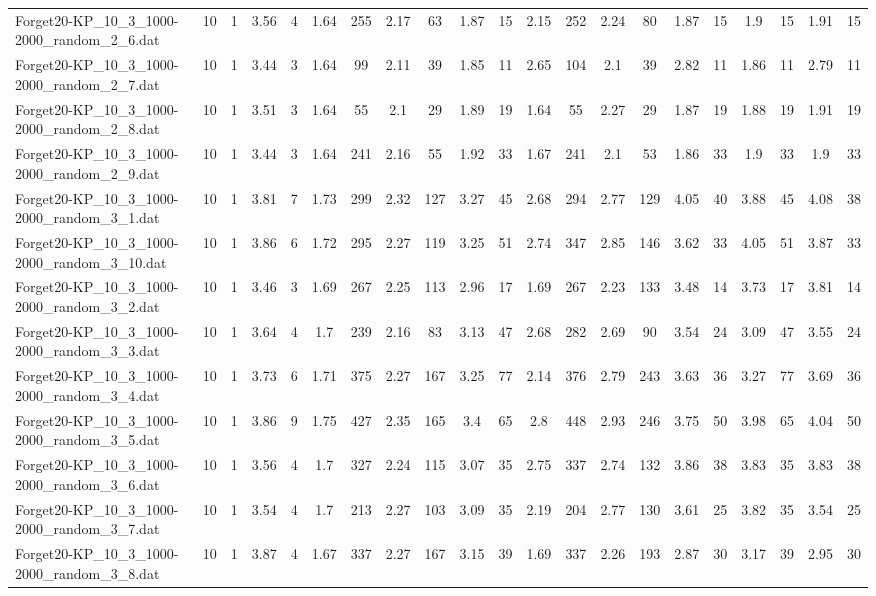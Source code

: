 \begin{sidewaystable}[!ht]
{\begin{tabular}{lcccccccccccccccccccc}
Forget20-KP\_10\_3\_1000-2000\_random\_2\_6.dat & 10 & 1 & 3.56 & 4 & 1.64 & 255 & 2.17 & 63 & 1.87 & 15 & 2.15 & 252 & 2.24 & 80 & 1.87 & 15 & 1.9 & 15 & 1.91 & 15 \\
Forget20-KP\_10\_3\_1000-2000\_random\_2\_7.dat & 10 & 1 & 3.44 & 3 & 1.64 & 99 & 2.11 & 39 & 1.85 & 11 & 2.65 & 104 & 2.1 & 39 & 2.82 & 11 & 1.86 & 11 & 2.79 & 11 \\
Forget20-KP\_10\_3\_1000-2000\_random\_2\_8.dat & 10 & 1 & 3.51 & 3 & 1.64 & 55 & 2.1 & 29 & 1.89 & 19 & 1.64 & 55 & 2.27 & 29 & 1.87 & 19 & 1.88 & 19 & 1.91 & 19 \\
Forget20-KP\_10\_3\_1000-2000\_random\_2\_9.dat & 10 & 1 & 3.44 & 3 & 1.64 & 241 & 2.16 & 55 & 1.92 & 33 & 1.67 & 241 & 2.1 & 53 & 1.86 & 33 & 1.9 & 33 & 1.9 & 33 \\
Forget20-KP\_10\_3\_1000-2000\_random\_3\_1.dat & 10 & 1 & 3.81 & 7 & 1.73 & 299 & 2.32 & 127 & 3.27 & 45 & 2.68 & 294 & 2.77 & 129 & 4.05 & 40 & 3.88 & 45 & 4.08 & 38 \\
Forget20-KP\_10\_3\_1000-2000\_random\_3\_10.dat & 10 & 1 & 3.86 & 6 & 1.72 & 295 & 2.27 & 119 & 3.25 & 51 & 2.74 & 347 & 2.85 & 146 & 3.62 & 33 & 4.05 & 51 & 3.87 & 33 \\
Forget20-KP\_10\_3\_1000-2000\_random\_3\_2.dat & 10 & 1 & 3.46 & 3 & 1.69 & 267 & 2.25 & 113 & 2.96 & 17 & 1.69 & 267 & 2.23 & 133 & 3.48 & 14 & 3.73 & 17 & 3.81 & 14 \\
Forget20-KP\_10\_3\_1000-2000\_random\_3\_3.dat & 10 & 1 & 3.64 & 4 & 1.7 & 239 & 2.16 & 83 & 3.13 & 47 & 2.68 & 282 & 2.69 & 90 & 3.54 & 24 & 3.09 & 47 & 3.55 & 24 \\
Forget20-KP\_10\_3\_1000-2000\_random\_3\_4.dat & 10 & 1 & 3.73 & 6 & 1.71 & 375 & 2.27 & 167 & 3.25 & 77 & 2.14 & 376 & 2.79 & 243 & 3.63 & 36 & 3.27 & 77 & 3.69 & 36 \\
Forget20-KP\_10\_3\_1000-2000\_random\_3\_5.dat & 10 & 1 & 3.86 & 9 & 1.75 & 427 & 2.35 & 165 & 3.4 & 65 & 2.8 & 448 & 2.93 & 246 & 3.75 & 50 & 3.98 & 65 & 4.04 & 50 \\
Forget20-KP\_10\_3\_1000-2000\_random\_3\_6.dat & 10 & 1 & 3.56 & 4 & 1.7 & 327 & 2.24 & 115 & 3.07 & 35 & 2.75 & 337 & 2.74 & 132 & 3.86 & 38 & 3.83 & 35 & 3.83 & 38 \\
Forget20-KP\_10\_3\_1000-2000\_random\_3\_7.dat & 10 & 1 & 3.54 & 4 & 1.7 & 213 & 2.27 & 103 & 3.09 & 35 & 2.19 & 204 & 2.77 & 130 & 3.61 & 25 & 3.82 & 35 & 3.54 & 25 \\
Forget20-KP\_10\_3\_1000-2000\_random\_3\_8.dat & 10 & 1 & 3.87 & 4 & 1.67 & 337 & 2.27 & 167 & 3.15 & 39 & 1.69 & 337 & 2.26 & 193 & 2.87 & 30 & 3.17 & 39 & 2.95 & 30 \\

\end{tabular}}
\end{sidewaystable}
